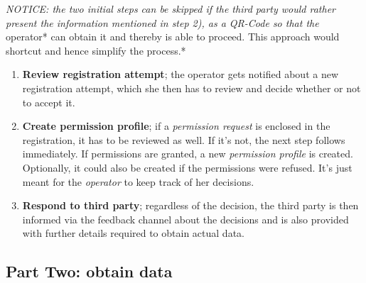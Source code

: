 \documentclass[12pt,english,a4paper,titlepage,cleardoublepage=empty,dottedtoc]{report}
\begin{document}
\emph{NOTICE: the two initial steps can be skipped if the third party
would rather present the information mentioned in step 2), as a QR-Code
so that the }operator* can obtain it and thereby is able to proceed.
This approach would shortcut and hence simplify the process.*

\begin{enumerate}
\def\labelenumi{\arabic{enumi})}
\setcounter{enumi}{2}
\item
  \textbf{Review registration attempt}; the operator gets notified about
  a new registration attempt, which she then has to review and decide
  whether or not to accept it.
\item
  \textbf{Create permission profile}; if a \emph{permission request} is
  enclosed in the registration, it has to be reviewed as well. If it's
  not, the next step follows immediately. If permissions are granted, a
  new \emph{permission profile} is created. Optionally, it could also be
  created if the permissions were refused. It's just meant for the
  \emph{operator} to keep track of her decisions.
\item
  \textbf{Respond to third party}; regardless of the decision, the third
  party is then informed via the feedback channel about the decisions
  and is also provided with further details required to obtain actual
  data.
\end{enumerate}

\subsection*{Part Two: obtain data}\label{part-two-obtain-data}
\end{document}
